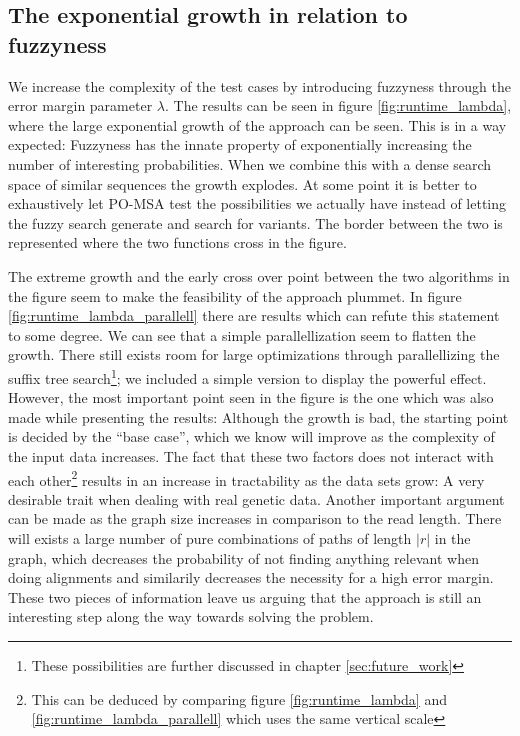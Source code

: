 \documentclass[thesis.tex]{subfiles}
\begin{document}
\subsection*{The exponential growth in relation to fuzzyness}
We increase the complexity of the test cases by introducing fuzzyness through the error margin parameter $\lambda$. The results can be seen in figure \ref{fig:runtime_lambda}, where the large exponential growth of the approach can be seen. This is in a way expected: Fuzzyness has the innate property of exponentially increasing the number of interesting probabilities. When we combine this with a dense search space of similar sequences the growth explodes. At some point it is better to exhaustively let PO-MSA test the possibilities we actually have instead of letting the fuzzy search generate and search for variants. The border between the two is represented where the two functions cross in the figure.\\
\par\noindent
The extreme growth and the early cross over point between the two algorithms in the figure seem to make the feasibility of the approach plummet. In figure \ref{fig:runtime_lambda_parallell} there are results which can refute this statement to some degree. We can see that a simple parallellization seem to flatten the growth. There still exists room for large optimizations through parallellizing the suffix tree search\footnote{These possibilities are further discussed in chapter \ref{sec:future_work}}; we included a simple version to display the powerful effect. However, the most important point seen in the figure is the one which was also made while presenting the results: Although the growth is bad, the starting point is decided by the ``base case'', which we know will improve as the complexity of the input data increases. The fact that these two factors does not interact with each other\footnote{This can be deduced by comparing figure \ref{fig:runtime_lambda} and \ref{fig:runtime_lambda_parallell} which uses the same vertical scale} results in an increase in tractability as the data sets grow: A very desirable trait when dealing with real genetic data. Another important argument can be made as the graph size increases in comparison to the read length. There will exists a large number of pure combinations of paths of length $|r|$ in the graph, which decreases the probability of not finding anything relevant when doing alignments and similarily decreases the necessity for a high error margin. These two pieces of information leave us arguing that the approach is still an interesting step along the way towards solving the problem.
\end{document}
